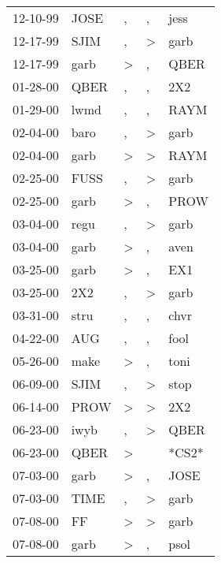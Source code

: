 \begin{supertabular}{lllll}
 12-10-99 &   JOSE &                , &                , &   jess \\
 12-17-99 &   SJIM &                , &     \textgreater &   garb \\
 12-17-99 &   garb &     \textgreater &                , &   QBER \\
 01-28-00 &   QBER &                , &                , &    2X2 \\
 01-29-00 &   lwmd &                , &                , &   RAYM \\
 02-04-00 &   baro &                , &     \textgreater &   garb \\
 02-04-00 &   garb &     \textgreater &     \textgreater &   RAYM \\
 02-25-00 &   FUSS &                , &     \textgreater &   garb \\
 02-25-00 &   garb &     \textgreater &                , &   PROW \\
 03-04-00 &   regu &                , &     \textgreater &   garb \\
 03-04-00 &   garb &     \textgreater &                , &   aven \\
 03-25-00 &   garb &     \textgreater &                , &    EX1 \\
 03-25-00 &    2X2 &                , &     \textgreater &   garb \\
 03-31-00 &   stru &                , &                , &   chvr \\
 04-22-00 &    AUG &                , &                , &   fool \\
 05-26-00 &   make &     \textgreater &                , &   toni \\
 06-09-00 &   SJIM &                , &     \textgreater &   stop \\
 06-14-00 &   PROW &     \textgreater &     \textgreater &    2X2 \\
 06-23-00 &   iwyb &                , &     \textgreater &   QBER \\
 06-23-00 &   QBER &     \textgreater &                  &  *CS2* \\
 07-03-00 &   garb &     \textgreater &                , &   JOSE \\
 07-03-00 &   TIME &                , &     \textgreater &   garb \\
 07-08-00 &     FF &     \textgreater &     \textgreater &   garb \\
 07-08-00 &   garb &     \textgreater &                , &   psol \\

\end{supertabular}

